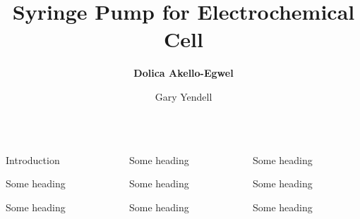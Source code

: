 \documentclass[final,t]{beamer}
\title[]{\huge Syringe Pump for Electrochemical Cell}
\author[]{\large \textbf{Dolica Akello-Egwel} \and Gary Yendell}
\date{}
\begin{document}
\begin{frame}
\maketitle
\begin{columns}[t]
  \begin{column}{.32\linewidth}
 
  \begin{block}{Introduction}
  \lipsum[1]
  \end{block}     

  \begin{block}{Some heading}
  \lipsum[1]
  \end{block}
  
  \begin{block}{Some heading}
  \lipsum[1]
  \end{block}
  
  
  \end{column}



  \begin{column}{.32\linewidth}
 
  \begin{block}{Some heading}
  \lipsum[1]
  \end{block}     

  \begin{block}{Some heading}
  \lipsum[1]
  \end{block}
  
  \begin{block}{Some heading}
  \lipsum[1]
  \end{block}
  
  
  \end{column}

  

  \begin{column}{.32\linewidth}
 
  \begin{block}{Some heading}
  \lipsum[1]
  \end{block}     

  \begin{block}{Some heading}
  \lipsum[1]
  \end{block}
  
  \begin{block}{Some heading}
  \lipsum[1]
  \end{block}
  
  
  \end{column}
  \end{columns}
    
\end{frame}
\end{document}
